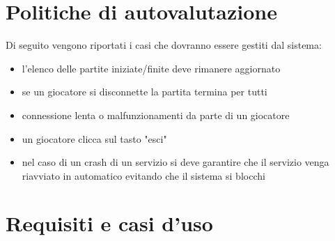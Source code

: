 \section{Politiche di autovalutazione} 
Di seguito vengono riportati i casi che dovranno essere gestiti dal sistema:
\begin{itemize}
    \item l'elenco delle partite iniziate/finite deve rimanere aggiornato
    \item se un giocatore si disconnette la partita termina per tutti 
    \item connessione lenta o malfunzionamenti da parte di un giocatore
    \item un giocatore clicca sul tasto "esci"
    \item nel caso di un crash di un servizio si deve garantire che il servizio venga riavviato in automatico evitando che il sistema si blocchi
\end{itemize}

\section{Requisiti e casi d'uso}
